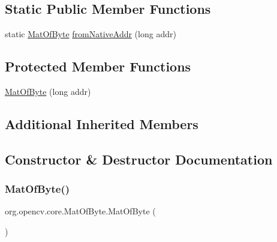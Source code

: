 \subsection*{Static Public Member Functions}
\begin{DoxyCompactItemize}
\item 
static \mbox{\hyperlink{classorg_1_1opencv_1_1core_1_1_mat_of_byte}{Mat\+Of\+Byte}} \mbox{\hyperlink{classorg_1_1opencv_1_1core_1_1_mat_of_byte_a696c3bd07a819347b1d9965ed18d581f}{from\+Native\+Addr}} (long addr)
\end{DoxyCompactItemize}
\subsection*{Protected Member Functions}
\begin{DoxyCompactItemize}
\item 
\mbox{\hyperlink{classorg_1_1opencv_1_1core_1_1_mat_of_byte_acd385819386fc638d97b9d3045ac8739}{Mat\+Of\+Byte}} (long addr)
\end{DoxyCompactItemize}
\subsection*{Additional Inherited Members}


\subsection{Constructor \& Destructor Documentation}
\mbox{\label{classorg_1_1opencv_1_1core_1_1_mat_of_byte_a47362cf5e0bf0fb16560ad3f1d2baf09}} 
\subsubsection{\texorpdfstring{Mat\+Of\+Byte()}{MatOfByte()}\hspace{0.1cm}{\footnotesize\ttfamily [1/4]}}
{\footnotesize\ttfamily org.\+opencv.\+core.\+Mat\+Of\+Byte.\+Mat\+Of\+Byte (\begin{DoxyParamCaption}{ }\end{DoxyParamCaption})}

\mbox{\label{classorg_1_1opencv_1_1core_1_1_mat_of_byte_acd385819386fc638d97b9d3045ac8739}} 
